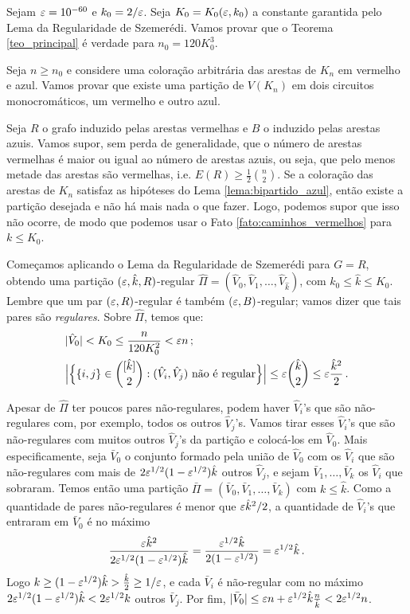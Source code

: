 Sejam $\varepsilon = 10^{-60}$ e $k_0 = 2/\varepsilon$. Seja $K_0 = K_0(\varepsilon, k_0)$ a constante garantida pelo Lema da Regularidade de Szemerédi. Vamos provar que o Teorema \ref{teo_principal} é verdade para $n_0 = 120K_0^3$.

Seja $n\geq n_0$ e considere uma coloração arbitrária das arestas de $K_n$ em vermelho e azul. Vamos provar que existe uma partição de $V(K_n)$ em dois circuitos monocromáticos, um vermelho e outro azul.

Seja $R$ o grafo induzido pelas arestas vermelhas e $B$ o induzido pelas arestas azuis. Vamos supor, sem perda de generalidade, que o número de arestas vermelhas é maior ou igual ao número de arestas azuis, ou seja, que pelo menos metade das arestas são vermelhas, i.e. $E(R)\geq \frac{1}{2}\binom{n}{2}$. 
Se a coloração das arestas de $K_n$ satisfaz as hipóteses do Lema \ref{lema:bipartido_azul}, então existe a partição desejada e não há mais nada o que fazer. Logo, podemos supor que isso não ocorre, de modo que podemos usar o Fato \ref{fato:caminhos_vermelhos} para $k\leq K_0$.

Começamos aplicando o Lema da Regularidade de Szemerédi para $G = R$, obtendo uma partição $(\varepsilon, \hat{k}, R)$-regular $\hat{\Pi} = (\hat{V}_0, \hat{V}_1, \dots, \hat{V}_{\hat{k}})$, com $k_0\leq \hat{k}\leq K_0$. Lembre que um par $(\varepsilon, R)$-regular é também $(\varepsilon, B)$-regular; vamos dizer que tais pares são \emph{regulares}. Sobre $\hat{\Pi}$, temos que:
\begin{align*}
	&|\hat{V}_0|<K_0\leq \frac{n}{120K_0^2}<\varepsilon n\,;\\
	&\Big|\Big\{\{i,j\}\in\binom{[\hat{k}]}{2}: (\hat{V}_i, \hat{V}_j) \text{ não é regular}\Big\}\Big| \leq \varepsilon\binom{\hat{k}}{2}\leq \varepsilon\frac{\hat{k}^2}{2}\,.
\end{align*}


Apesar de $\hat{\Pi}$ ter poucos pares não-regulares, podem haver $\hat{V}_i$'s que são não-regulares com, por exemplo, todos os outros $\hat{V}_j$'s. Vamos tirar esses $\hat{V}_i$'s que são não-regulares com muitos outros $\hat{V}_j$'s da partição e colocá-los em $\hat{V}_0$. Mais especificamente, seja $\bar{V}_0$ o conjunto formado pela união de $\hat{V}_0$ com os $\hat{V}_i$ que são não-regulares com mais de $2\varepsilon^{1/2}(1-\varepsilon^{1/2})\hat{k}$ outros $\hat{V}_j$, e sejam $\bar{V}_1, \dots, \bar{V}_k$ os $\hat{V}_i$ que sobraram. Temos então uma partição $\bar{\Pi} = (\bar{V}_0, \bar{V}_1, \dots, \bar{V}_k)$ com $k\leq \hat{k}$. Como a quantidade de pares não-regulares é menor que $\varepsilon\hat{k}^2/2$, a quantidade de $\hat{V}_i$'s que entraram em $\bar{V}_0$ é no máximo
\[
	\frac{\varepsilon\hat{k}^2}{2\varepsilon^{1/2}(1-\varepsilon^{1/2})\hat{k}} = \frac{\varepsilon^{1/2}\hat{k}}{2(1-\varepsilon^{1/2})} = \varepsilon^{1/2}\hat{k}\,.
\]
Logo $k\geq(1-\varepsilon^{1/2})\hat{k}>\frac{\hat{k}}{2}\geq 1/\varepsilon$, e cada $\bar{V}_i$ é não-regular com no máximo $2\varepsilon^{1/2}(1-\varepsilon^{1/2})\hat{k} < 2\varepsilon^{1/2}k$ outros $\bar{V}_j$. Por fim, $|\bar{V}_0|\leq \varepsilon n + \varepsilon^{1/2}\hat{k}\frac{n}{\hat{k}}<2\varepsilon^{1/2}n$.

